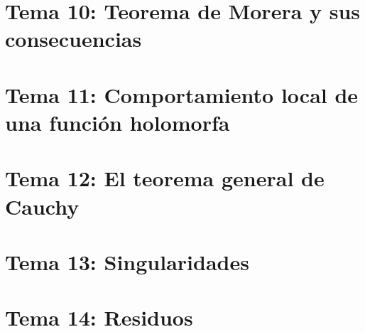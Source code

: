 \documentclass[12pt]{book}
\begin{document}
    \chapter{Tema 10: Teorema de Morera y sus consecuencias}
    \newpage
    \setcounter{page}{123}
    \chapter{Tema 11: Comportamiento local de una función holomorfa}
    \newpage
    \setcounter{page}{133}
    \chapter{Tema 12: El teorema general de Cauchy}
    \newpage
    \setcounter{page}{147}
    \chapter{Tema 13: Singularidades}
    \newpage
    \setcounter{page}{163}
    \chapter{Tema 14: Residuos}
\end{document}
